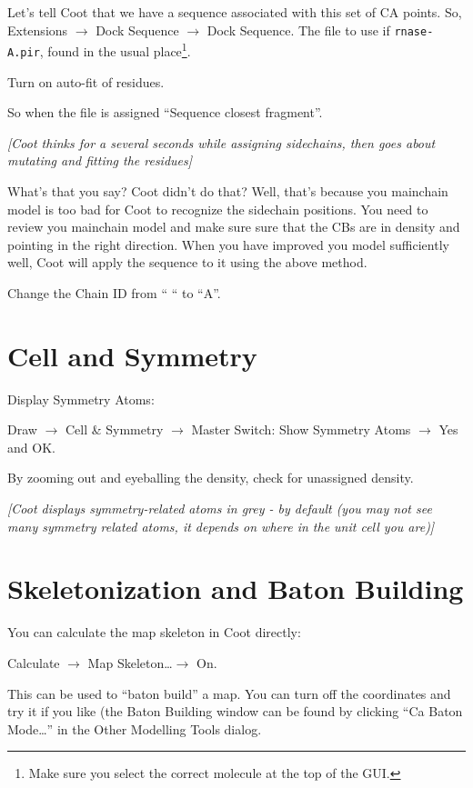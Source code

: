 \documentclass{article}
\begin{document}
Let's tell Coot that we have a sequence associated with this set
of CA points.  So, \textsf{Extensions $\rightarrow$ Dock Sequence
  $\rightarrow$ Dock Sequence}. The file to use if \texttt{rnase-A.pir},
 found in the usual place\footnote{Make sure you select the correct 
molecule at the top of the GUI.}.

Turn on auto-fit of residues.

So when the file is assigned ``Sequence closest fragment''.

\textsl{ [Coot thinks for a several seconds while assigning
  sidechains, then goes about mutating and fitting the residues]}

What's that you say?  Coot didn't do that?  Well, that's because you
mainchain model is too bad for Coot to recognize the sidechain
positions.  You need to review you mainchain model and make sure sure
that the CBs are in density and pointing in the right direction.  When
you have improved you model sufficiently well, Coot will apply the
sequence to it using the above method.

Change the Chain ID from `` `` to ``A''.

\section{Cell and Symmetry}

Display Symmetry Atoms:

\textsf{Draw $\rightarrow$ Cell \& Symmetry $\rightarrow$ Master
  Switch: Show Symmetry Atoms $\rightarrow$ Yes} and \textsf{OK}.

By zooming out and eyeballing the density, check for unassigned density.

\textsl{ [Coot displays symmetry-related atoms in grey - by default
  (you may not see many symmetry related atoms, it depends on where in
  the unit cell you are)]}

\section{Skeletonization and Baton Building}


You can calculate the map skeleton in Coot directly:

\textsf{Calculate $\rightarrow$ Map Skeleton\ldots $\rightarrow$ On.}

This can be used to ``baton build'' a map.  You can turn off the
coordinates and try it if you like (the Baton Building window can be
found by clicking \textsf{``Ca Baton Mode\ldots''} in the Other
Modelling Tools dialog.
  
\end{document}

